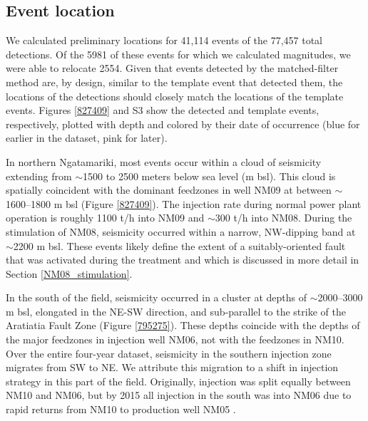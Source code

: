 \subsection{Event location} \label{location_results}
We calculated preliminary locations for 41,114 events of the 77,457 total detections. Of the 5981 of these events for which we calculated magnitudes, we were able to relocate 2554. Given that events detected by the matched-filter method are, by design, similar to the template event that detected them, the locations of the detections should closely match the locations of the template events. Figures \ref{827409} and S3 show the detected and template events, respectively, plotted with depth and colored by their date of occurrence (blue for earlier in the dataset, pink for later).

In northern Ngatamariki, most events occur within a cloud of seismicity extending from $\sim$1500 to 2500 meters below sea level (m bsl). This cloud is spatially coincident with the dominant \glspl{feedzone} in well NM09 at between $\sim$1600--1800 m bsl (Figure \ref{827409}). The injection rate during normal power plant operation is roughly 1100 t/h into NM09 and $\sim$300 t/h into NM08. During the \gls{stimulation} of NM08, seismicity occurred within a narrow, NW-dipping band at $\sim$2200 m bsl. These events likely define the extent of a suitably-oriented fault that was activated during the treatment and which is discussed in more detail in Section \ref{NM08_stimulation}.

In the south of the field, seismicity occurred in a cluster at depths of $\sim$2000--3000 m bsl, elongated in the NE-SW direction, and sub-parallel to the strike of the Aratiatia Fault Zone (Figure \ref{795275}). These depths coincide with the depths of the major \glspl{feedzone} in injection well NM06, not with the \glspl{feedzone} in NM10. Over the entire four-year dataset, seismicity in the southern injection zone migrates from SW to NE. We attribute this migration to a shift in injection strategy in this part of the field. Originally, injection was split equally between NM10 and NM06, but by 2015 all injection in the south was into NM06 due to rapid returns from NM10 to production well NM05 \citep{buscarlet_2015}.

